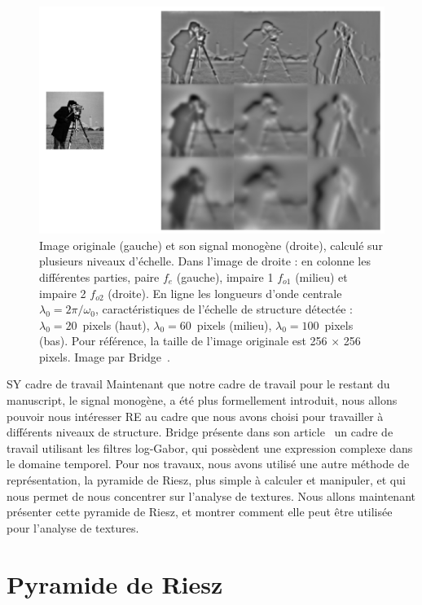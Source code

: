 \begin{figure}
    \centering
    \includegraphics[width=.75\textwidth]{resources/images/cameraman_monogenic}
    \caption[Signal monogène calculé pour plusieurs niveaux d'échelle]{Image originale (gauche) et son signal monogène (droite), calculé sur plusieurs niveaux d'échelle. Dans l'image de droite : en colonne les différentes parties, paire $f_e$ (gauche), impaire 1 $f_{o1}$ (milieu) et impaire 2 $f_{o2}$ (droite). En ligne les longueurs d'onde centrale $\lambda_0 = 2\pi/\omega_0$, caractéristiques de l'échelle de structure détectée : $\lambda_0 = 20$~pixels (haut), $\lambda_0 = 60$~pixels (milieu), $\lambda_0 = 100$~pixels (bas). Pour référence, la taille de l'image originale est 256 $\times$ 256 pixels. Image par Bridge~\cite{bridge_introduction_2018}.}
    \label{fig:cameraman-monogenic}
\end{figure}



\bigskip
{\color{red} SY cadre de travail}
Maintenant que notre cadre de travail pour le restant du manuscript, le signal monogène, a été plus formellement introduit, nous allons pouvoir nous intéresser RE au cadre que nous avons choisi pour travailler à différents niveaux de structure. Bridge présente dans son article~\cite{bridge_introduction_2018} un cadre de travail utilisant les filtres log-Gabor, qui possèdent une expression complexe dans le domaine temporel. Pour nos travaux, nous avons utilisé une autre méthode de représentation, la pyramide de Riesz, plus simple à calculer et manipuler, et qui nous permet de nous concentrer sur l'analyse de textures. Nous allons maintenant présenter cette pyramide de Riesz, et montrer comment elle peut être utilisée pour l'analyse de textures.

\section{Pyramide de Riesz}

